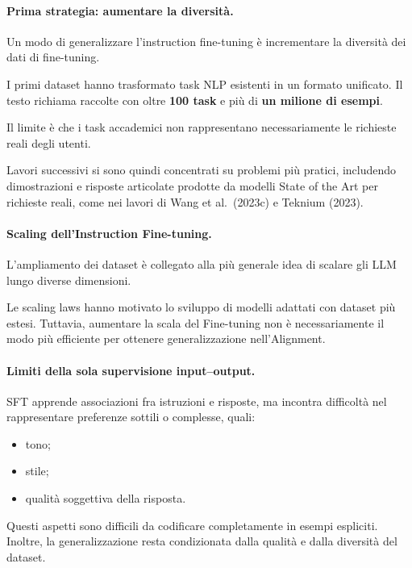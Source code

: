 \paragraph{Prima strategia: aumentare la diversità.}
Un modo di generalizzare l'instruction fine-tuning è incrementare la diversità dei dati di fine-tuning.

I primi dataset hanno trasformato task NLP esistenti
in un formato unificato. Il testo richiama
raccolte con oltre \textbf{100 task}
e più di \textbf{un milione di esempi}.

Il limite è che i task accademici
non rappresentano necessariamente
le richieste reali degli utenti.

Lavori successivi si sono quindi concentrati
su problemi più pratici, includendo dimostrazioni
e risposte articolate prodotte da modelli
State of the Art per richieste reali,
come nei lavori di Wang et al.\ (2023c)
e Teknium (2023).

\paragraph{Scaling dell'Instruction Fine-tuning.}
L'ampliamento dei dataset è collegato
alla più generale idea di scalare gli LLM
lungo diverse dimensioni.

Le scaling laws hanno motivato lo sviluppo
di modelli adattati con dataset più estesi.
Tuttavia, aumentare la scala del Fine-tuning
non è necessariamente il modo più efficiente
per ottenere generalizzazione nell'Alignment.

\paragraph{Limiti della sola supervisione input--output.}
SFT apprende associazioni fra istruzioni e risposte,
ma incontra difficoltà nel rappresentare
preferenze sottili o complesse, quali:

\begin{itemize}
    \item tono;

    \item stile;

    \item qualità soggettiva della risposta.
\end{itemize}

Questi aspetti sono difficili da codificare
completamente in esempi espliciti.
Inoltre, la generalizzazione resta condizionata
dalla qualità e dalla diversità del dataset.

